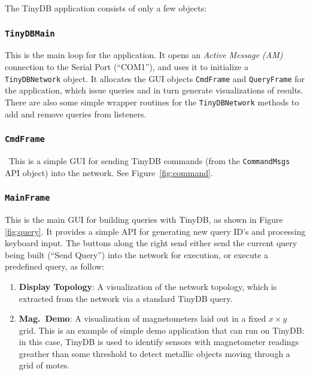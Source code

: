 \documentclass[11pt]{article}
\begin{document}
The TinyDB application consists of only a few objects:
\subsubsection{\tt TinyDBMain}
\label{sec:tinydbmain}
This is the main loop for the application.  It
  opens an {\em Active Message (AM)} connection to
  the Serial Port (``COM1''), and uses it to initialize a {\tt
  TinyDBNetwork} object.  It
  allocates the GUI objects {\tt CmdFrame} and {\tt QueryFrame} for
  the application, which issue queries and in turn generate visualizations
  of results.  There are also some simple wrapper routines for
  the {\tt TinyDBNetwork} methods to add and remove queries from listeners.


\subsubsection{\tt CmdFrame}\
This is a simple GUI for sending TinyDB commands
  (from the {\tt CommandMsgs} API\index{API} object) into the network.  See Figure~\ref{fig:command}.

\subsubsection{\tt MainFrame}\label{sec:cmdframe}\label{sec:queryframe}
This is the main GUI\index{GUI} for building queries with TinyDB, as shown in Figure \ref{fig:query}.  
It provides a simple API for generating new query ID's and processing keyboard input.  The buttons along
the right send either send the current query being built (``Send Query'') into the network for
execution, or execute a predefined query, as follow:

 \begin{enumerate}
  \item {\bf Display Topology}: A visualization of the network topology, which is extracted
  from the network via a standard TinyDB\index{TinyDB} query.

  \item {\bf Mag.\ Demo}: A visualization of magnetometers laid out in a fixed $x \times
  y$ grid. This is an example of simple demo application that can run on
  TinyDB:  in this case, TinyDB is used to identify sensors with 
  magnetometer readings greather than some threshold to detect metallic
  objects moving through a grid of motes\index{mote}. 
  \end{enumerate}
\end{document}
